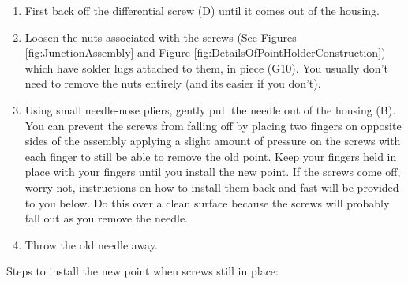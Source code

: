 \documentclass{../lab}
\begin{document}
\begin{enumerate}
    \item First back off the differential screw (D) until it comes out of the housing.

    \item Loosen the nuts associated with the screws (See Figures \ref{fig:JunctionAssembly} and Figure \ref{fig:DetailsOfPointHolderConstruction}) which have solder lugs attached to them, in piece (G10). You usually don't need to remove the nuts entirely (and its easier if you don't).

    \item Using small needle-nose pliers, gently pull the needle out of the housing (B).  You can prevent the screws from falling off by placing two fingers on opposite sides of the assembly applying a slight amount of pressure on the screws with each finger to still be able to remove the old point. Keep your fingers held in place with your fingers until you install the new point. If the screws come off, worry not, instructions on how to install them back and  fast will be provided to you below. Do this over a clean surface because the screws will probably fall out as you remove the needle.

    \item Throw the old needle away.

\end{enumerate}

\noindent Steps to install the new point when screws still in place:
\end{document}
